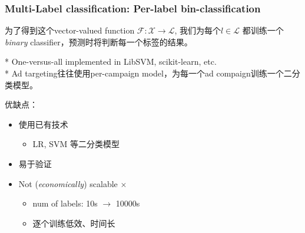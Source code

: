 \documentclass{beamer}
\begin{document}
\begin{frame}
\frametitle{Multi-Label classification: Per-label bin-classification}

为了得到这个vector-valued function $\mathcal{F} : \mathcal{X} \rightarrow \mathcal{L}$, 我们为每个$\mathit{l} \in \mathcal{L}$ 都训练一个\textit{binary} classifier，预测时将判断每一个标签的结果。

{\small \color{gray} * One-versus-all implemented in LibSVM, scikit-learn, etc.} \\
{\small \color{gray} * Ad targeting往往使用per-campaign model，为每一个ad compaign训练一个二分类模型。}
\pause

优缺点：
\begin{itemize}
\item 使用已有技术 {  \color{green} \checkmark}
  \begin{itemize}
  \item LR, SVM 等二分类模型
  \end{itemize}
\item 易于验证 {  \color{green} \checkmark}
\item Not (\textit{economically}) scalable  {  \color{red} $\times$}
  \begin{itemize}
  \item num of labels: 10s $\rightarrow$ 10000s 
  \item 逐个训练低效、时间长
  \end{itemize}
\end{itemize}
\end{frame}
\end{document}
